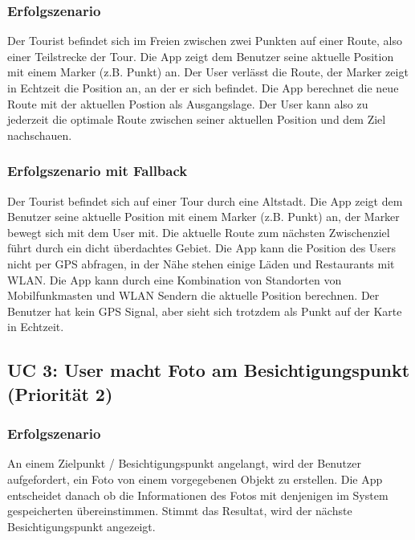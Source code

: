 \documentclass[a4paper,10pt,xetex]{article}
\begin{document}
\subsubsection{Erfolgszenario}\label{erfolgszenario}

Der Tourist befindet sich im Freien zwischen zwei Punkten auf einer
Route, also einer Teilstrecke der Tour. Die App zeigt dem Benutzer seine
aktuelle Position mit einem Marker (z.B. Punkt) an. Der User verlässt
die Route, der Marker zeigt in Echtzeit die Position an, an der er sich
befindet. Die App berechnet die neue Route mit der aktuellen Postion als
Ausgangslage. Der User kann also zu jederzeit die optimale Route
zwischen seiner aktuellen Position und dem Ziel nachschauen.

\subsubsection{Erfolgszenario mit
Fallback}\label{erfolgszenario-mit-fallback}

Der Tourist befindet sich auf einer Tour durch eine Altstadt. Die App
zeigt dem Benutzer seine aktuelle Position mit einem Marker (z.B. Punkt)
an, der Marker bewegt sich mit dem User mit. Die aktuelle Route zum
nächsten Zwischenziel führt durch ein dicht überdachtes Gebiet. Die App
kann die Position des Users nicht per GPS abfragen, in der Nähe stehen
einige Läden und Restaurants mit WLAN. Die App kann durch eine
Kombination von Standorten von Mobilfunkmasten und WLAN Sendern die
aktuelle Position berechnen. Der Benutzer hat kein GPS Signal, aber
sieht sich trotzdem als Punkt auf der Karte in Echtzeit.

\subsection{UC 3: User macht Foto am Besichtigungspunkt (Priorität
2)}\label{uc-3-user-macht-foto-am-besichtigungspunkt-priorituxe4t-2}

\subsubsection{Erfolgszenario}\label{erfolgszenario-1}

An einem Zielpunkt / Besichtigungspunkt angelangt, wird der Benutzer
aufgefordert, ein Foto von einem vorgegebenen Objekt zu erstellen. Die
App entscheidet danach ob die Informationen des Fotos mit denjenigen im
System gespeicherten übereinstimmen. Stimmt das Resultat, wird der
nächste Besichtigungspunkt angezeigt.
\end{document}
